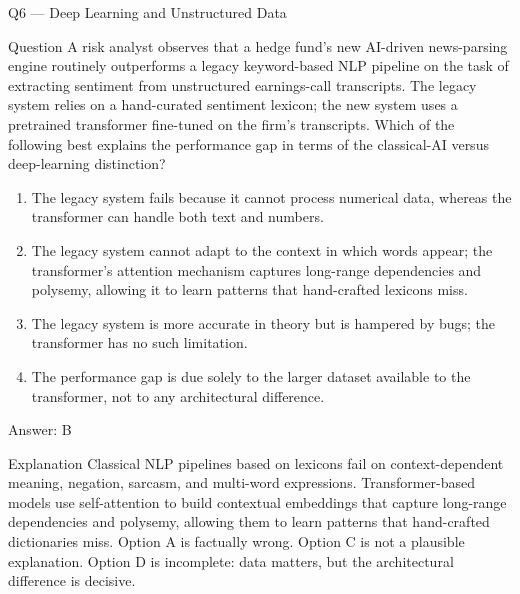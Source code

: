\documentclass[aspectratio=169,8pt]{beamer}
\begin{document}
	\begin{frame}{Q6 --- Deep Learning and Unstructured Data}
		\begin{block}{Question}
			A risk analyst observes that a hedge fund's new AI-driven news-parsing engine routinely outperforms a legacy keyword-based NLP pipeline on the task of extracting sentiment from unstructured earnings-call transcripts. The legacy system relies on a hand-curated sentiment lexicon; the new system uses a pretrained transformer fine-tuned on the firm's transcripts. Which of the following best explains the performance gap in terms of the classical-AI versus deep-learning distinction?
		\end{block}
		\begin{enumerate}
			\item The legacy system fails because it cannot process numerical data, whereas the transformer can handle both text and numbers.
			\item The legacy system cannot adapt to the context in which words appear; the transformer's attention mechanism captures long-range dependencies and polysemy, allowing it to learn patterns that hand-crafted lexicons miss.
			\item The legacy system is more accurate in theory but is hampered by bugs; the transformer has no such limitation.
			\item The performance gap is due solely to the larger dataset available to the transformer, not to any architectural difference.
		\end{enumerate}
		\begin{exampleblock}{Answer: B}\end{exampleblock}
		\begin{block}{Explanation}
			Classical NLP pipelines based on lexicons fail on context-dependent meaning, negation, sarcasm, and multi-word expressions. Transformer-based models use self-attention to build contextual embeddings that capture long-range dependencies and polysemy, allowing them to learn patterns that hand-crafted dictionaries miss. Option A is factually wrong. Option C is not a plausible explanation. Option D is incomplete: data matters, but the architectural difference is decisive.
		\end{block}
	\end{frame}
	
\end{document}
